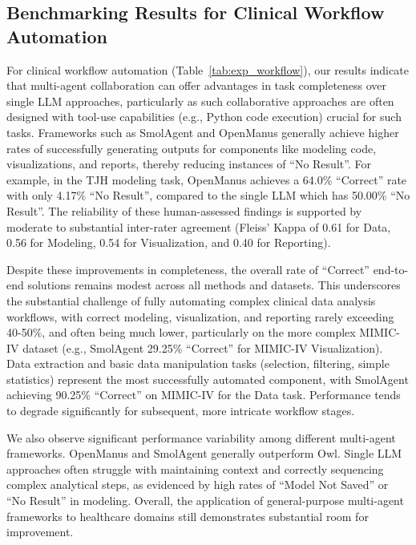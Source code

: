 \documentclass{article}
\begin{document}
\subsection{Benchmarking Results for Clinical Workflow Automation}
For clinical workflow automation (Table~\ref{tab:exp_workflow}), our results indicate that multi-agent collaboration can offer advantages in task completeness over single LLM approaches, particularly as such collaborative approaches are often designed with tool-use capabilities (e.g., Python code execution) crucial for such tasks. Frameworks such as SmolAgent and OpenManus generally achieve higher rates of successfully generating outputs for components like modeling code, visualizations, and reports, thereby reducing instances of ``No Result''. For example, in the TJH modeling task, OpenManus achieves a 64.0\% ``Correct'' rate with only 4.17\% ``No Result'', compared to the single LLM which has 50.00\% ``No Result''. The reliability of these human-assessed findings is supported by moderate to substantial inter-rater agreement (Fleiss' Kappa of 0.61 for Data, 0.56 for Modeling, 0.54 for Visualization, and 0.40 for Reporting).

Despite these improvements in completeness, the overall rate of ``Correct'' end-to-end solutions remains modest across all methods and datasets. This underscores the substantial challenge of fully automating complex clinical data analysis workflows, with correct modeling, visualization, and reporting rarely exceeding 40-50\%, and often being much lower, particularly on the more complex MIMIC-IV dataset (e.g., SmolAgent 29.25\% ``Correct'' for MIMIC-IV Visualization). Data extraction and basic data manipulation tasks (selection, filtering, simple statistics) represent the most successfully automated component, with SmolAgent achieving 90.25\% ``Correct'' on MIMIC-IV for the Data task. Performance tends to degrade significantly for subsequent, more intricate workflow stages.

We also observe significant performance variability among different multi-agent frameworks. OpenManus and SmolAgent generally outperform Owl. Single LLM approaches often struggle with maintaining context and correctly sequencing complex analytical steps, as evidenced by high rates of ``Model Not Saved'' or ``No Result'' in modeling. Overall, the application of general-purpose multi-agent frameworks to healthcare domains still demonstrates substantial room for improvement.
\end{document}
